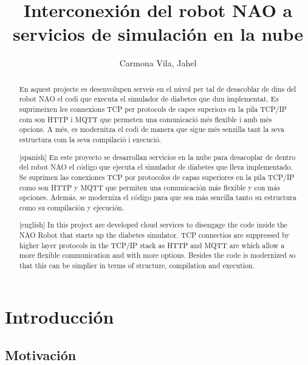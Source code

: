 \documentclass[12pt,spanish,listoffigures,listoftables]{tfgetsinf}
\title{Interconexión del robot NAO a servicios de simulación en la nube}
\author{Carmona Vila, Jahel}
\begin{document}
\begin{abstract}
En aquest projecte es desenvolupen serveis en el núvol per tal de desacoblar de dins del robot NAO el codi que executa el simulador de diabetes que duu implementat. Es suprimeixen les connexions TCP per protocols de capes superiors en la pila TCP/IP com son HTTP i MQTT que permeten una comunicació més flexible i amb més opcions. A més, es modernitza el codi de manera que sigue més senzilla tant la seva estructura com la seva compilació i execució.
\end{abstract}
\begin{abstract}[spanish]
En este proyecto se desarrollan servicios en la nube para desacoplar de dentro del robot NAO el código que ejecuta el simulador de diabetes que lleva implementado. Se suprimen las conexiones TCP por protocolos de capas superiores en la pila TCP/IP como son HTTP y MQTT que permiten una comunicación más flexible y con más opciones. Además, se moderniza el código para que sea más sencilla tanto su estructura como su compilación y ejecución.
\end{abstract}
\begin{abstract}[english]
In this project are developed cloud services to disengage the code inside the NAO Robot that starts up the diabetes simulator. TCP connectios are suppressed by higher layer protocols in the TCP/IP stack as HTTP and MQTT are which allow a more flexible communication and with more options. Besides the code is modernized so that this can be simplier in terms of structure, compilation and execution.
\end{abstract}


\mainmatter


\chapter{Introducción}

\section{Motivación}
\end{document}
